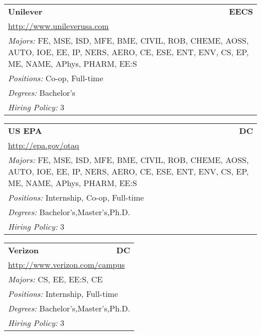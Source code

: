 \documentclass[twoside]{article}
\begin{document}
\begin{center}
\begin{multicols}{3}
\begin{FlushLeft}
\begin{minipage}{\columnwidth}\begin{tabularx}{.95\columnwidth}{Xr}
                 {\Large\bf Unilever} & {\Large\bf EECS}\\
    \multicolumn{2}{p{.95\columnwidth}}{\url{http://www.unileverusa.com}}\\
    \multicolumn{2}{p{.95\columnwidth}}{\emph{Majors:} FE, MSE, ISD, MFE, BME, CIVIL, ROB, CHEME, AOSS, AUTO, IOE, EE, IP, NERS, AERO, CE, ESE, ENT, ENV, CS, EP, ME, NAME, APhys, PHARM, EE:S}\\
    \multicolumn{2}{p{.95\columnwidth}}{\emph{Positions:} Co-op, Full-time}\\
    \multicolumn{2}{p{.95\columnwidth}}{\emph{Degrees:} Bachelor's}\\
    \multicolumn{2}{p{.95\columnwidth}}{\emph{Hiring Policy:} 3}\\
    \end{tabularx}
    
\end{minipage}
 
\begin{minipage}{\columnwidth}\begin{tabularx}{.95\columnwidth}{Xr}
                 {\Large\bf US EPA} & {\Large\bf DC}\\
    \multicolumn{2}{p{.95\columnwidth}}{\url{http://epa.gov/otaq}}\\
    \multicolumn{2}{p{.95\columnwidth}}{\emph{Majors:} FE, MSE, ISD, MFE, BME, CIVIL, ROB, CHEME, AOSS, AUTO, IOE, EE, IP, NERS, AERO, CE, ESE, ENT, ENV, CS, EP, ME, NAME, APhys, PHARM, EE:S}\\
    \multicolumn{2}{p{.95\columnwidth}}{\emph{Positions:} Internship, Co-op, Full-time}\\
    \multicolumn{2}{p{.95\columnwidth}}{\emph{Degrees:} Bachelor's,Master's,Ph.D.}\\
    \multicolumn{2}{p{.95\columnwidth}}{\emph{Hiring Policy:} 3}\\
    \end{tabularx}
    
\end{minipage}
 
\begin{minipage}{\columnwidth}\begin{tabularx}{.95\columnwidth}{Xr}
                 {\Large\bf Verizon} & {\Large\bf DC}\\
    \multicolumn{2}{p{.95\columnwidth}}{\url{http://www.verizon.com/campus}}\\
    \multicolumn{2}{p{.95\columnwidth}}{\emph{Majors:} CS, EE, EE:S, CE}\\
    \multicolumn{2}{p{.95\columnwidth}}{\emph{Positions:} Internship, Full-time}\\
    \multicolumn{2}{p{.95\columnwidth}}{\emph{Degrees:} Bachelor's,Master's,Ph.D.}\\
    \multicolumn{2}{p{.95\columnwidth}}{\emph{Hiring Policy:} 3}\\
    \end{tabularx}
    

\end{minipage}
\end{FlushLeft}
\end{multicols}
\end{center}
\end{document}
